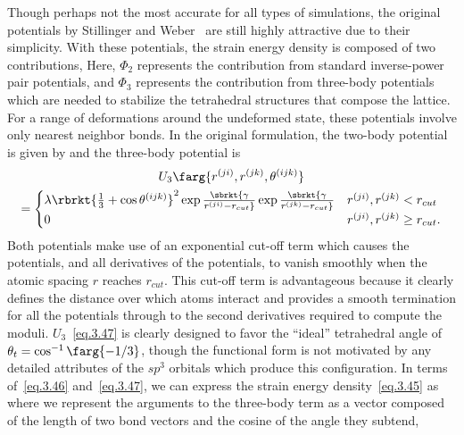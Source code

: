 Though perhaps not
the most accurate for all types of simulations, the original potentials
by Stillinger and Weber~\cite{Stillinger1985} 
are still highly attractive due to their
simplicity. With these potentials, the strain energy density is composed
of two contributions,
Here, $\Phi_2$ represents the contribution from standard inverse-power pair potentials,
and $\Phi_3$ represents the contribution from three-body
potentials which are needed to stabilize the tetrahedral structures that compose
the lattice. For a range of deformations around the
undeformed state, these potentials involve only nearest neighbor bonds.
In the original formulation\cite{Stillinger1985}, the two-body potential is
given by
and the three-body potential is
\begin{multline} \label{eq.3.47}
U_3 \farg{r^{(ji)},r^{(jk)},\theta^{(ijk)}} \\
=
   \begin{cases}
   \lambda \rbrkt{{1 \over 3} + \cos \theta^{(ijk)}}^2 
   \exp \sbrkt{\gamma \over r^{(ji)} - r_{cut}}
   \exp \sbrkt{\gamma \over r^{(jk)} - r_{cut}} &
   r^{(ji)} , r^{(jk)} < r_{cut} \\
   0 &
   r^{(ji)} , r^{(jk)} \geq r_{cut}.
   \end{cases}
\end{multline}
Both potentials make 
use of an exponential cut-off term which causes the potentials, and
all derivatives of the potentials, to vanish smoothly when the atomic spacing $r$ 
reaches $r_{cut}$. This cut-off term is advantageous because it clearly defines the
distance over which atoms interact and provides a smooth termination for all the
potentials through to the second derivatives required to compute the moduli.
$U_3$~\eqref{eq.3.47} is clearly designed to favor the ``ideal'' tetrahedral angle of
$\theta_t = \cos^{-1} \farg{-1/3}$, though the functional
form is not motivated by any detailed attributes of the $sp^{3}$ orbitals which
produce this configuration. In terms of~\eqref{eq.3.46} and~\eqref{eq.3.47}, 
we can express the strain energy density~\eqref{eq.3.45} as
where we represent the arguments to the three-body term as a vector composed of
the length of two bond vectors and the cosine of the angle they subtend,

